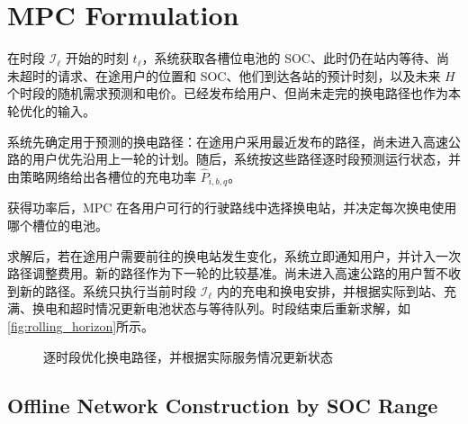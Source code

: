 \documentclass[12pt,a4paper,UTF8]{ctexart}
\begin{document}
\section{MPC Formulation}

在时段 $\mathcal I_\ell$ 开始的时刻 $t_\ell$，系统获取各槽位电池的 SOC、此时仍在站内等待、尚未超时的请求、在途用户的位置和 SOC、他们到达各站的预计时刻，以及未来 $H$ 个时段的随机需求预测和电价。已经发布给用户、但尚未走完的换电路径也作为本轮优化的输入。

系统先确定用于预测的换电路径：在途用户采用最近发布的路径，尚未进入高速公路的用户优先沿用上一轮的计划。随后，系统按这些路径逐时段预测运行状态，并由策略网络给出各槽位的充电功率 $\widehat P_{i,b,q}$。

获得功率后，MPC 在各用户可行的行驶路线中选择换电站，并决定每次换电使用哪个槽位的电池。

求解后，若在途用户需要前往的换电站发生变化，系统立即通知用户，并计入一次路径调整费用。新的路径作为下一轮的比较基准。尚未进入高速公路的用户暂不收到新的路径。系统只执行当前时段 $\mathcal I_\ell$ 内的充电和换电安排，并根据实际到站、充满、换电和超时情况更新电池状态与等待队列。时段结束后重新求解，如\autoref{fig:rolling_horizon}所示。

\begin{figure}[!htbp]
  \centering
  \caption{逐时段优化换电路径，并根据实际服务情况更新状态}
  \label{fig:rolling_horizon}
\end{figure}


\subsection{Offline Network Construction by SOC Range}
\end{document}
